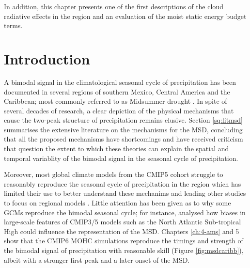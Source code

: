 In addition, this chapter presents one of the first descriptions of the cloud radiative effects in the region and an evaluation of the moist static energy budget terms.

\section{Introduction}

A bimodal signal in the climatological seasonal cycle of precipitation has been documented in several regions of southern Mexico, Central America and the Caribbean; most commonly referred to as Midsummer drought  \citep[MSD][]{mosino1966,magana1999,gamble2008,perdigon2018,zhao2020}.  
In spite of several decades of research, a clear depiction of the physical mechanisms that cause the two-peak structure of precipitation remains elusive. 
Section \ref{sq:litmsd} summarises the extensive literature on the mechanisms for the MSD, concluding that all the proposed mechanisms have shortcomings and have received criticism that question the extent to which these theories can explain the spatial and temporal variablity of the bimodal signal in the seasonal cycle of precipitation.

Moreover, most global climate models from the CMIP5 cohort struggle to reasonably reproduce the seasonal cycle of precipitation in the region \citep{rauscher2008,ryu2014} which has limited their use to better understand these mechanims and leading other studies to focus on regional models \citep{fuentes2015inter,cavazos2020}.  
Little attention has been given as to why some GCMs reproduce the bimodal seasonal cycle; for instance, \cite{ryu2014} analysed how biases in large-scale features of CMIP3/5 models such as the North Atlantic Sub-tropical High could influence the representation of the MSD.  
 Chapters \ref{ch:4-ams} and 5 show that the CMIP6 MOHC simulations reproduce the timings and strength of the bimodal signal of precipitation with reasonable skill (Figure \ref{fig:msdcaribb}), albeit with a stronger first peak and a later onset of the MSD. 

